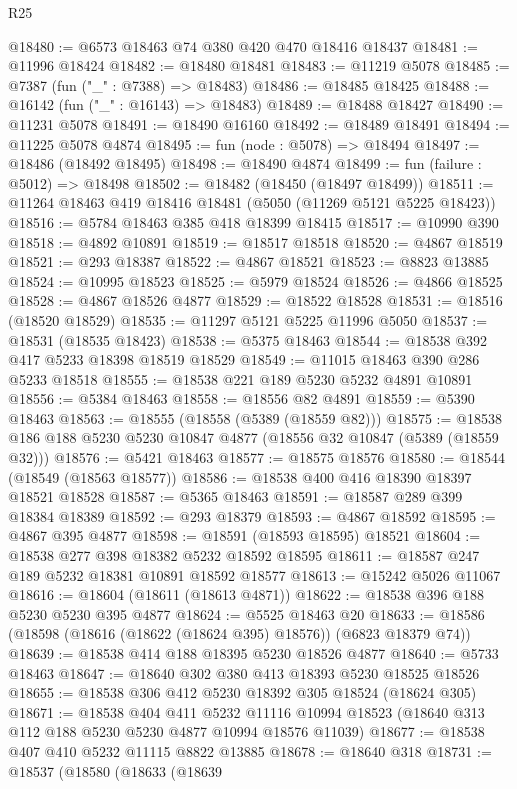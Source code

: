 \begin{lexlean}{R25}
\begin{coremodule}
@18480 := @6573 @18463 @74 @380 @420 @470 @18416 @18437
@18481 := @11996 @18424
@18482 := @18480 @18481
@18483 := @11219 @5078
@18485 := @7387 (fun ("_" : @7388) => @18483)
@18486 := @18485 @18425
@18488 := @16142 (fun ("_" : @16143) => @18483)
@18489 := @18488 @18427
@18490 := @11231 @5078
@18491 := @18490 @16160
@18492 := @18489 @18491
@18494 := @11225 @5078 @4874
@18495 := fun (node : @5078) => @18494
@18497 := @18486 (@18492 @18495)
@18498 := @18490 @4874
@18499 := fun (failure : @5012) => @18498
@18502 := @18482 (@18450 (@18497 @18499))
@18511 := @11264 @18463 @419 @18416 @18481 (@5050 (@11269 @5121 @5225 @18423))
@18516 := @5784 @18463 @385 @418 @18399 @18415
@18517 := @10990 @390
@18518 := @4892 @10891
@18519 := @18517 @18518
@18520 := @4867 @18519
@18521 := @293 @18387
@18522 := @4867 @18521
@18523 := @8823 @13885
@18524 := @10995 @18523
@18525 := @5979 @18524
@18526 := @4866 @18525
@18528 := @4867 @18526 @4877
@18529 := @18522 @18528
@18531 := @18516 (@18520 @18529)
@18535 := @11297 @5121 @5225 @11996 @5050
@18537 := @18531 (@18535 @18423)
@18538 := @5375 @18463
@18544 := @18538 @392 @417 @5233 @18398 @18519 @18529
@18549 := @11015 @18463 @390 @286 @5233 @18518
@18555 := @18538 @221 @189 @5230 @5232 @4891 @10891
@18556 := @5384 @18463
@18558 := @18556 @82 @4891
@18559 := @5390 @18463
@18563 := @18555 (@18558 (@5389 (@18559 @82)))
@18575 := @18538 @186 @188 @5230 @5230 @10847 @4877 (@18556 @32 @10847 (@5389 (@18559 @32)))
@18576 := @5421 @18463
@18577 := @18575 @18576
@18580 := @18544 (@18549 (@18563 @18577))
@18586 := @18538 @400 @416 @18390 @18397 @18521 @18528
@18587 := @5365 @18463
@18591 := @18587 @289 @399 @18384 @18389
@18592 := @293 @18379
@18593 := @4867 @18592
@18595 := @4867 @395 @4877
@18598 := @18591 (@18593 @18595) @18521
@18604 := @18538 @277 @398 @18382 @5232 @18592 @18595
@18611 := @18587 @247 @189 @5232 @18381 @10891 @18592 @18577
@18613 := @15242 @5026 @11067
@18616 := @18604 (@18611 (@18613 @4871))
@18622 := @18538 @396 @188 @5230 @5230 @395 @4877
@18624 := @5525 @18463 @20
@18633 := @18586 (@18598 (@18616 (@18622 (@18624 @395) @18576)) (@6823 @18379 @74))
@18639 := @18538 @414 @188 @18395 @5230 @18526 @4877
@18640 := @5733 @18463
@18647 := @18640 @302 @380 @413 @18393 @5230 @18525 @18526
@18655 := @18538 @306 @412 @5230 @18392 @305 @18524 (@18624 @305)
@18671 := @18538
    @404
    @411
    @5232
    @11116
    @10994
    @18523
    (@18640 @313 @112 @188 @5230 @5230 @4877 @10994 @18576 @11039)
@18677 := @18538 @407 @410 @5232 @11115 @8822 @13885
@18678 := @18640 @318
@18731 := @18537
    (@18580
      (@18633
        (@18639

\end{coremodule}
\end{lexlean}
